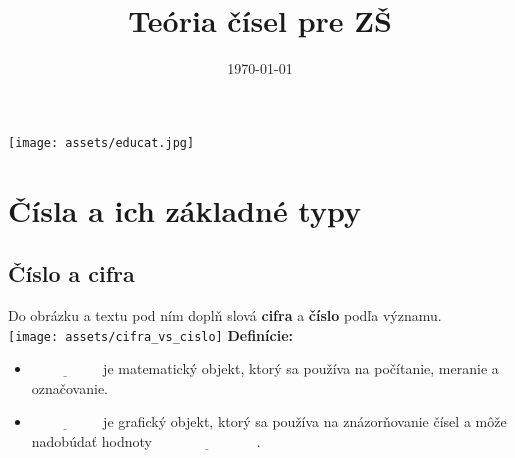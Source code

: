 \documentclass[12pt]{article}
\begin{document}
	\title{\textbf{Teória čísel pre ZŠ}}
	
	
	\date{\today}
	\author{}
	\maketitle
	\begin{center}
		\texttt{[image: assets/educat.jpg]}
	\end{center}
	\tableofcontents
	\newpage
	
	\section{Čísla a ich základné typy}
	\subsection{Číslo a cifra}
	Do obrázku a textu pod ním doplň slová \textbf{cifra} a \textbf{číslo} podľa významu.\\
	\texttt{[image: assets/cifra\_vs\_cislo]} 
	\newline
	\textbf{Definície:}
	\begin{itemize}
		\item $\underline{\hspace{2cm}}$ je matematický objekt, ktorý sa používa na počítanie, meranie a označovanie.
		\item $\underline{\hspace{2cm}}$ je grafický objekt, ktorý sa používa na znázorňovanie čísel a môže nadobúdať hodnoty $\underline{\hspace{3cm}}$.
	\end{itemize}
	
\end{document}
